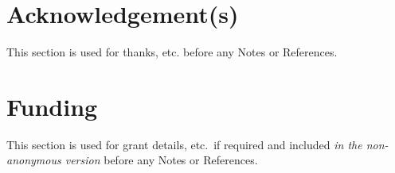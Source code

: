 \documentclass[]{interact}
\theoremstyle{plain}%
\theoremstyle{definition}
\theoremstyle{remark}
\begin{document}
\section*{Acknowledgement(s)}

This section is used for thanks, etc. before any Notes or References.




\section*{Funding}

This section is used for grant details, etc.\ if required and included \emph{in the non-anonymous version} before any Notes or References.









\end{document}
